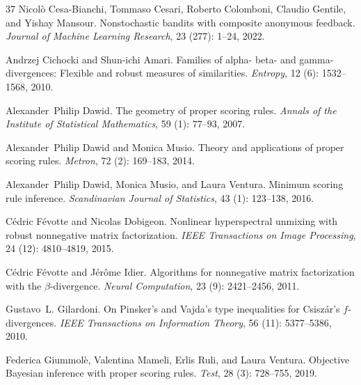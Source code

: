 \documentclass[11pt,oneside,a4paper]{article}
\theoremstyle{plain}
\theoremstyle{definition}
\theoremstyle{remark}
\begin{document}
\begin{thebibliography}{37}
Nicol{\`o} Cesa-Bianchi, Tommaso Cesari, Roberto Colomboni, Claudio Gentile, and Yishay Mansour.
\newblock Nonstochastic bandits with composite anonymous feedback.
\newblock \emph{Journal of Machine Learning Research}, 23 (277): 1--24, 2022.

Andrzej Cichocki and Shun-ichi Amari.
\newblock Families of alpha- beta- and gamma- divergences: Flexible and robust measures of similarities.
\newblock \emph{Entropy}, 12 (6): 1532--1568, 2010.

Alexander~Philip Dawid.
\newblock The geometry of proper scoring rules.
\newblock \emph{Annals of the Institute of Statistical Mathematics}, 59 (1): 77--93, 2007.

Alexander~Philip Dawid and Monica Musio.
\newblock Theory and applications of proper scoring rules.
\newblock \emph{Metron}, 72 (2): 169--183, 2014.

Alexander~Philip Dawid, Monica Musio, and Laura Ventura.
\newblock Minimum scoring rule inference.
\newblock \emph{Scandinavian Journal of Statistics}, 43 (1): 123--138, 2016.

C{\'e}dric F{\'e}votte and Nicolas Dobigeon.
\newblock Nonlinear hyperspectral unmixing with robust nonnegative matrix factorization.
\newblock \emph{IEEE Transactions on Image Processing}, 24 (12): 4810--4819, 2015.

C{\'e}dric F{\'e}votte and J{\'e}r{\^o}me Idier.
\newblock Algorithms for nonnegative matrix factorization with the $\beta$-divergence.
\newblock \emph{Neural Computation}, 23 (9): 2421--2456, 2011.

Gustavo~L. Gilardoni.
\newblock On {Pinsker}'s and {Vajda}'s type inequalities for {Csiszár}'s $f$-divergences.
\newblock \emph{IEEE Transactions on Information Theory}, 56 (11): 5377--5386, 2010.

Federica Giummol{\`e}, Valentina Mameli, Erlis Ruli, and Laura Ventura.
\newblock Objective {Bayesian} inference with proper scoring rules.
\newblock \emph{Test}, 28 (3): 728--755, 2019.


\end{thebibliography}
\end{document}
